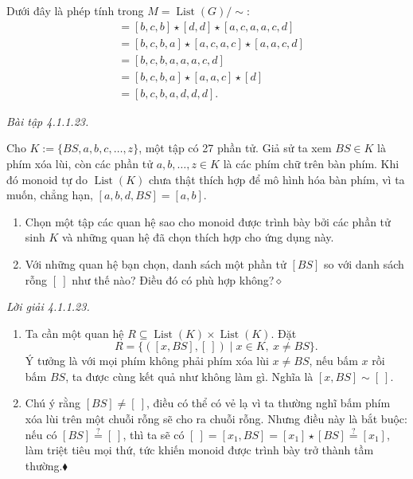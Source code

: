 Dưới đây là phép tính trong $M=\operatorname{List}(G)/{\sim}$:
\begin{align*}
[b,c,b,d,d,a,c,a,a,c,d]
&=[b,c,b]\star[d,d]\star[a,c,a,a,c,d]\\
&=[b,c,b,a]\star[a,c,a,c]\star[a,a,c,d]\\
&=[b,c,b,a,a,a,c,d]\\
&=[b,c,b,a]\star[a,a,c]\star[d]\\
&=[b,c,b,a,d,d,d].
\end{align*}

\noindent\textit{Bài tập 4.1.1.23.}\keepwithnext

Cho $K:=\{BS,a,b,c,\ldots,z\}$, một tập có 27 phần tử. Giả sử ta xem $BS\in K$ là phím xóa lùi, còn các phần tử $a,b,\ldots,z\in K$ là các phím chữ trên bàn phím. Khi đó monoid tự do $\operatorname{List}(K)$ chưa thật thích hợp để mô hình hóa bàn phím, vì ta muốn, chẳng hạn, $[a,b,d,BS]=[a,b]$.
\begin{enumerate}[label=\alph*.]
\item Chọn một tập các quan hệ sao cho monoid được trình bày bởi các phần tử sinh $K$ và những quan hệ đã chọn thích hợp cho ứng dụng này.
\item Với những quan hệ bạn chọn, danh sách một phần tử $[BS]$ so với danh sách rỗng $[\ ]$ như thế nào? Điều đó có phù hợp không?\nobreak\hfill$\diamond$
\end{enumerate}

\noindent\textit{Lời giải 4.1.1.23.}\keepwithnext
\begin{enumerate}[label=\alph*.]
\item Ta cần một quan hệ $R\subseteq\operatorname{List}(K)\times\operatorname{List}(K)$. Đặt
\[
R=\{([x,BS],[\ ])\mid x\in K,\ x\ne BS\}.
\]
Ý tưởng là với mọi phím không phải phím xóa lùi $x\ne BS$, nếu bấm $x$ rồi bấm $BS$, ta được cùng kết quả như không làm gì. Nghĩa là $[x,BS]\sim[\ ]$.
\item Chú ý rằng $[BS]\ne[\ ]$, điều có thể có vẻ lạ vì ta thường nghĩ bấm phím xóa lùi trên một chuỗi rỗng sẽ cho ra chuỗi rỗng. Nhưng điều này là bắt buộc: nếu có $[BS]\overset{?}{=}[\ ]$, thì ta sẽ có $[\ ]=[x_1,BS]=[x_1]\star[BS]\overset{?}{=}[x_1]$, làm triệt tiêu mọi thứ, tức khiến monoid được trình bày trở thành tầm thường.\nobreak\hfill$\blacklozenge$
\end{enumerate}

